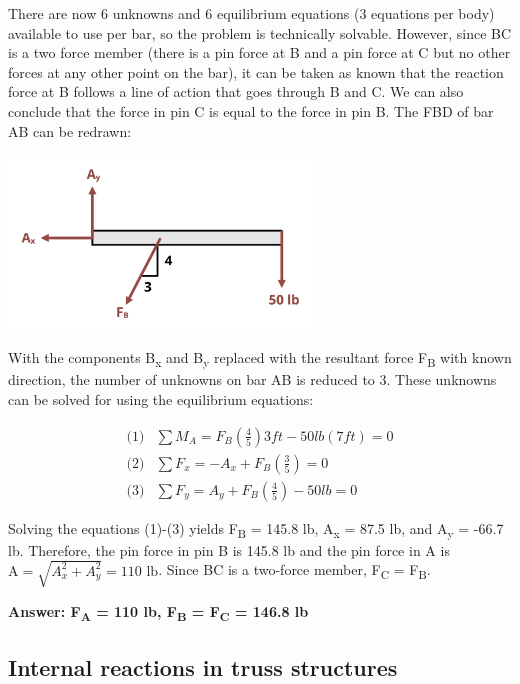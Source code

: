\documentclass[
  letterpaper,
  DIV=11,
  numbers=noendperiod]{scrreprt}
\begin{document}
\begin{tcolorbox}
There are now 6 unknowns and 6 equilibrium equations (3 equations per
body) available to use per bar, so the problem is technically solvable.
However, since BC is a two force member (there is a pin force at B and a
pin force at C but no other forces at any other point on the bar), it
can be taken as known that the reaction force at B follows a line of
action that goes through B and C. We can also conclude that the force in
pin C is equal to the force in pin B. The FBD of bar AB can be redrawn:

\begin{center}
\includegraphics[width=3.1875in,height=\textheight]{images/CH1 PNGs/example 1.3 part 3.png}
\end{center}

With the components B\textsubscript{x} and B\textsubscript{y} replaced
with the resultant force F\textsubscript{B} with known direction, the
number of unknowns on bar AB is reduced to 3. These unknowns can be
solved for using the equilibrium equations:

\[
\begin{aligned}
\text{(1)} & \sum M_A=F_B\left(\frac{4}{5}\right) 3 f t-50 l b(7 f t)=0 \\
\text{(2)} & \sum F_x=-A_x+F_B\left(\frac{3}{5}\right)=0 \\
\text{(3)} & \sum F_y=A_y+F_B\left(\frac{4}{5}\right)-50 l b=0
\end{aligned}
\]

Solving the equations (1)-(3) yields F\textsubscript{B} = 145.8 lb,
A\textsubscript{x} = 87.5 lb, and A\textsubscript{y} = -66.7 lb.
Therefore, the pin force in pin B is 145.8 lb and the pin force in A is
\(\mathrm{A}=\sqrt{A_x^2+A_y^2}=110 \text{ lb}\). Since BC is a
two-force member, F\textsubscript{C} = F\textsubscript{B}.

\textbf{Answer: F\textsubscript{A} = 110 lb, F\textsubscript{B} =
F\textsubscript{C} = 146.8 lb}

\end{tcolorbox}

\subsection{Internal reactions in truss
structures}\label{internal-reactions-in-truss-structures}
\end{document}
